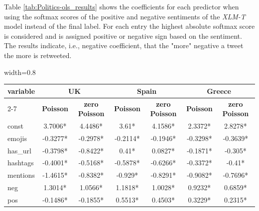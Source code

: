 Table \ref{tab:Politics-ols_results} shows the coefficients for each predictor when using the softmax scores of the positive and negative sentiments of the \textit{XLM-T} model instead of the final label. For each entry the highest absolute softmax score is considered and is assigned positive or negative sign based on the sentiment. The results indicate, i.e., negative coefficient, that the "more" negative a tweet the more is retweeted.



\begin{table}[hbp!]
\centering
\begin{subtable}[t]{\textwidth}
\centering
\begin{adjustbox}{width=0.8\textwidth}
\begin{tabular}{|l|cc|cc|cc|}
\hline
\multirow{2}{*}{\textbf{variable}} &
  \multicolumn{2}{c|}{\textbf{UK}} &
  \multicolumn{2}{c|}{\textbf{Spain}} &
  \multicolumn{2}{c|}{\textbf{Greece}} \\ \cline{2-7} 
 &
  \multicolumn{1}{c|}{\textbf{Poisson}} &
  \textbf{zero Poisson} &
  \multicolumn{1}{c|}{\textbf{Poisson}} &
  \textbf{zero Poisson} &
  \multicolumn{1}{c|}{\textbf{Poisson}} &
  \textbf{zero Poisson} \\ \hline
const     & \multicolumn{1}{c|}{3.7006*} & 4.4486* & \multicolumn{1}{c|}{3.61*} & 4.1586* & \multicolumn{1}{c|}{2.3372*} & 2.8278* \\ \hline
emojis    & \multicolumn{1}{c|}{-0.3277*} & -0.2978* & \multicolumn{1}{c|}{-0.2114*} & -0.1946* & \multicolumn{1}{c|}{-0.3298*} & -0.3639* \\ \hline
has\_url  & \multicolumn{1}{c|}{-0.3798*} & -0.8422* & \multicolumn{1}{c|}{0.41*} & 0.0827* & \multicolumn{1}{c|}{-0.1871*} & -0.305* \\ \hline
hashtags  & \multicolumn{1}{c|}{-0.4001*} & -0.5168* & \multicolumn{1}{c|}{-0.5878*} & -0.6266* & \multicolumn{1}{c|}{-0.3372*} & -0.41* \\ \hline
mentions  & \multicolumn{1}{c|}{-1.4615*} & -0.8382* & \multicolumn{1}{c|}{-0.929*} & -0.8291* & \multicolumn{1}{c|}{-0.9082*} & -0.7696* \\ \hline
neg       & \multicolumn{1}{c|}{1.3014*} & 1.0566* & \multicolumn{1}{c|}{1.1818*} & 1.0028* & \multicolumn{1}{c|}{0.9232*} & 0.6859* \\ \hline
pos       & \multicolumn{1}{c|}{-0.1486*} & -0.1855* & \multicolumn{1}{c|}{0.5513*} & 0.4503* & \multicolumn{1}{c|}{0.3229*} & 0.2315* \\ \hline
\end{tabular}
\end{adjustbox}
\end{subtable}


\end{table}
